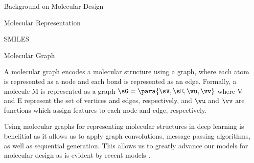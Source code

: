 \documentclass{article}
\begin{document}
\begin{psection}{Background on Molecular Design}
\begin{psubsection}{Molecular Representation}
\begin{pssubsection}{SMILES}
		\end{pssubsection}

		\begin{pssubsection}{Molecular Graph}

			A molecular graph encodes a molecular structure using a graph, where each atom is represented as a node and each bond is represented as an edge. Formally, a molecule M is represented as a graph $\sG = \para{\sV, \sE, \vu, \vv}$ where V and E represent the set of vertices and edges, respectively, and $\vu$ and $\vv$ are functions which assign features to each node and edge, respectively.

			Using molecular graphs for representing molecular structures in deep learning is benefitial as it allows us to apply graph convolutions, message passing algorithms, as well as sequential generation. This allows us to greatly advance our models for molecular design as is evident by recent models \cite{cgvae, jtvae}.

		\end{pssubsection}
	\end{psubsection}

\end{psection}
\end{document}
